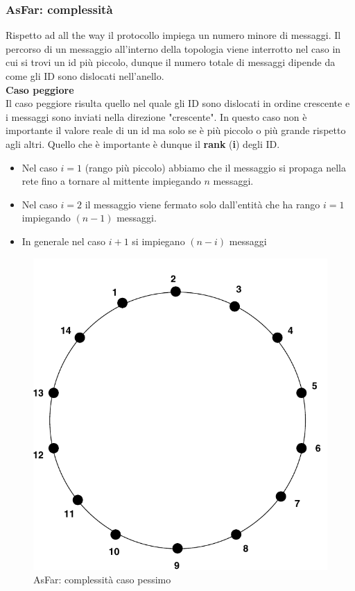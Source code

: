\documentclass[12pt]{article}
\begin{document}
		\subsubsection{AsFar: complessità}
			Rispetto ad all the way il protocollo impiega un numero minore di messaggi. Il percorso di un messaggio all'interno della topologia viene interrotto nel caso in cui si trovi un id più piccolo, dunque il numero totale di messaggi dipende da come gli ID sono dislocati nell'anello.\\
			\textbf{Caso peggiore}\\
			Il caso peggiore risulta quello nel quale gli ID sono dislocati in ordine crescente e i messaggi sono inviati nella direzione "crescente". In questo caso non è importante il valore reale di un id ma solo se è più piccolo o più grande rispetto agli altri. Quello che è importante è dunque il \textbf{rank} (\textbf{i}) degli ID. 
			\begin{itemize}
				\item Nel caso $i=1$ (rango più piccolo) abbiamo che il messaggio si propaga nella rete fino a tornare al mittente impiegando $n$ messaggi.
				\item Nel caso $i=2$ il messaggio viene fermato solo dall'entità che ha rango $i=1$ impiegando $(n-1)$ messaggi.
				\item In generale nel caso $i+1$ si impiegano $(n-i)$ messaggi 
			\end{itemize}
			\begin{figure}[h!]
				\centering
				\includegraphics[scale=0.25]{img/worscas.png}
				\caption{AsFar: complessità caso pessimo}
			\end{figure}
\end{document}
